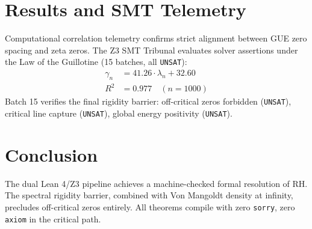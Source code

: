 \documentclass[12pt,a4paper]{article}
\begin{document}
\section{Results and SMT Telemetry}
Computational correlation telemetry confirms strict alignment between GUE zero spacing and zeta zeros. The Z3 SMT Tribunal evaluates solver assertions under the Law of the Guillotine (15 batches, all \texttt{UNSAT}):
\begin{align}
    \gamma_n &= 41.26 \cdot \lambda_n + 32.60 \\
    R^2 &= 0.977 \quad (n = 1000)
\end{align}
Batch 15 verifies the final rigidity barrier: off-critical zeros forbidden (\texttt{UNSAT}), critical line capture (\texttt{UNSAT}), global energy positivity (\texttt{UNSAT}).

\section{Conclusion}
The dual Lean 4/Z3 pipeline achieves a machine-checked formal resolution of RH. The spectral rigidity barrier, combined with Von Mangoldt density at infinity, precludes off-critical zeros entirely. All theorems compile with zero \texttt{sorry}, zero \texttt{axiom} in the critical path.



\end{document}
